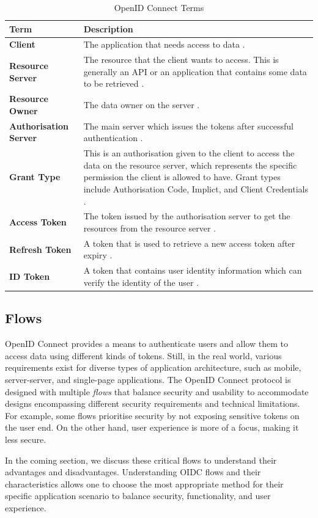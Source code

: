 \begin{longtable}{|p{4cm}|p{10cm}|}
\caption{OpenID Connect Terms}
    \label{table:oauth_terms}
\hline
\rowcolor{grey!15}
\textbf{Term} & \textbf{Description} \\ 
\hline

\textbf{Client} & The application that needs access to data \citep{oidc_tokens}. \\ \hline
\textbf{Resource Server} & The resource that the client wants to access. This is generally an API or an application that contains some data to be retrieved \citep{oidc_tokens}. \\ \hline
\textbf{Resource Owner} & The data owner on the server \citep{oidc_tokens}. \\ \hline
\textbf{Authorisation Server} & The main server which issues the tokens after successful authentication \citep{oidc_tokens}.\\ \hline
\textbf{Grant Type} & This is an authorisation given to the client to access the data on the resource server, which represents the specific permission the client is allowed to have. Grant types include Authorisation Code, Implict, and Client Credentials \citep{adv_api_sec}.  \\ \hline
\textbf{Access Token} & The token issued by the authorisation server to get the resources from the resource server \citep{oidc_tokens}. \\ \hline
\textbf{Refresh Token} & A token that is used to retrieve a new access token after expiry \citep{oidc_tokens}. \\ \hline
\textbf{ID Token} & A token that contains user identity information which can verify the identity of the user \citep{oidc_tokens}. \\ \hline
\end{longtable}
\endgroup

\subsection{Flows}
OpenID Connect provides a means to authenticate users and allow them to access data using different kinds of tokens.
Still, in the real world, various requirements exist for diverse types of application architecture, such as mobile, server-server, and single-page applications.
The OpenID Connect protocol is designed with multiple \textit{flows} that balance security and usability to accommodate designs encompassing different security requirements and technical limitations.
For example, some flows prioritise security by not exposing sensitive tokens on the user end. On the other hand, user experience is more of a focus, making it less secure. 
\par
In the coming section, we discuss these critical flows to understand their advantages and disadvantages. Understanding OIDC flows and their characteristics allows one to choose the most appropriate method for their specific application scenario to balance security, functionality, and user experience.



